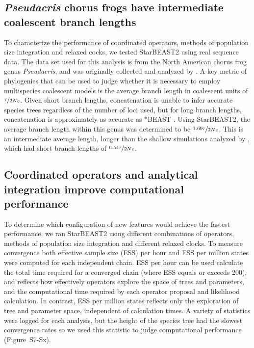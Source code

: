 \documentclass[12pt]{article}
\begin{document}
\subsection{\textit{Pseudacris} chorus frogs have intermediate coalescent branch lengths}

To characterize the performance of coordinated operators, methods of population size
integration and relaxed cocks, we tested StarBEAST2 using real sequence data.
The data set used for this analysis is from the North American chorus frog genus
\textit{Pseudacris}, and was originally collected and analyzed by
\cite{Barrow201478}. A key metric of phylogenies that can be used to judge
whether it is necessary to employ multispecies coalescent models is the average
branch length in coalescent units of $\nicefrac{\tau}{2Ne}$. Given short branch
lengths, concatenation is unable to infer accurate species trees regardless of
the number of loci used, but for long branch lengths, concatenation is
approximately as accurate as *BEAST \citep{Ogilvie01052016}. Using StarBEAST2,
the average branch length within this genus was determined to be
$\nicefrac{1.69\tau}{2Ne}$. This is an intermediate average length, longer than
the shallow simulations analyzed by \cite{Ogilvie01052016}, which had short
branch lengths of $\nicefrac{0.54\tau}{2Ne}$.

\subsection{Coordinated operators and analytical integration improve computational performance}

To determine which configuration of new features would achieve the fastest
performance, we ran StarBEAST2 using different combinations of operators,
methods of population size integration and different relaxed clocks. To measure
convergence both effective sample size (ESS) per hour and ESS per million states
were computed for each independent chain. ESS per hour can be used calculate the
total time required for a converged chain (where ESS equals or exceeds 200),
and reflects how effectively operators explore the space of trees and parameters, and the computational time
required by each operator proposal and likelihood calculation. In contrast, ESS per
million states reflects only the exploration of tree and parameter space,
independent of calculation times. A variety of statistics were logged for each
analysis, but the height of the species tree had the slowest convergence rates
so we used this statistic to judge computational performance (Figure~S7-Sx).
\end{document}
